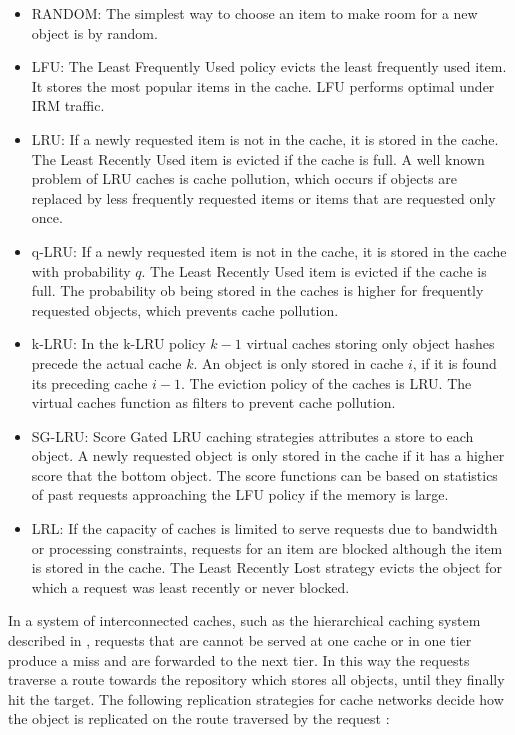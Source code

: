 \begin{itemize}
  \itemsep0em
  \item RANDOM: The simplest way to choose an item to make room for a new object is by random.
  \item LFU: The Least Frequently Used policy evicts the least frequently used item.
  It stores the most popular items in the cache.
  LFU performs optimal under IRM traffic.
  \item LRU: If a newly requested item is not in the cache, it is stored in the cache. The Least Recently Used item is evicted if the cache is full.
  A well known problem of LRU caches is cache pollution, which occurs if objects are replaced by less frequently requested items or items that are requested only once.
  \item q-LRU: If a newly requested item is not in the cache, it is stored in the cache with probability $q$. The Least Recently Used item is evicted if the cache is full.
  The probability ob being stored in the caches is higher for frequently requested objects, which prevents cache pollution. \cite{martina2014unified}
  \item k-LRU: In the k-LRU policy $k-1$ virtual caches storing only object hashes precede the actual cache $k$. An object is only stored in cache $i$, if it is found its preceding cache $i-1$. The eviction policy of the caches is LRU.
  The virtual caches function as filters to prevent cache pollution. \cite{martina2014unified}
  \item SG-LRU: Score Gated LRU caching strategies attributes a store to each object. A newly requested object is only stored in the cache if it has a higher score that the bottom object. The score functions can be based on statistics of past requests approaching the LFU policy if the memory is large. \cite{hasslinger2014caching}
  \item LRL: If the capacity of caches is limited to serve requests due to bandwidth or processing constraints, requests for an item are blocked although the item is stored in the cache. The Least Recently Lost strategy evicts the object for which a request was least recently or never blocked. \cite{leconte2014adaptive}
\end{itemize}

In a system of interconnected caches, such as the hierarchical caching system described in , requests that are cannot be served at one cache or in one tier produce a miss and are forwarded to the next tier.
In this way the requests traverse a route towards the repository which stores all objects, until they finally hit the target.
The following replication strategies for cache networks decide how the object is replicated on the route traversed by the request \cite{rossini2014coupling,martina2014unified}:

